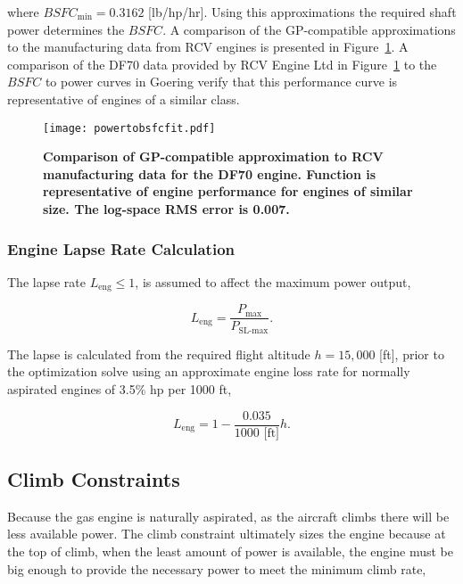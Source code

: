 \documentclass[]{aiaa-tc}%
\begin{document}
where $BSFC_{\text{min}} = 0.3162$ [lb/hp/hr].\cite{rcvengines}
Using this approximations the required shaft power determines the $BSFC$.
A comparison of the GP-compatible approximations to the manufacturing data from RCV engines is presented in Figure~\ref{f:powervsweightfit}. A comparison of the DF70 data provided by RCV Engine Ltd in Figure~\ref{f:powervsweightfit} to the $BSFC$ to power curves in Goering\cite{bsfcperf} verify that this performance curve is representative of engines of a similar class. 

\begin{figure}[H]
	\begin{center}
	\texttt{[image: powertobsfcfit.pdf]}
 \caption{\textbf{Comparison of GP-compatible approximation to RCV manufacturing data for the DF70 engine.  Function is representative of engine performance for engines of similar size.  The log-space RMS error is 0.007. }}
	\label{f:powervsweightfit}
	\end{center}
\end{figure}

\subsubsection{Engine Lapse Rate Calculation}

The lapse rate $L_{\text{eng}} \leq 1$, is assumed to affect the maximum power output,

\begin{equation}
    \label{e:lapse}
    L_{\text{eng}} = \frac{P_{\text{max}}}{P_{\text{SL-max}}}.
\end{equation}

The lapse is calculated from the required flight altitude $h=15,000$ [ft], prior to the optimization solve using an approximate engine loss rate for normally aspirated engines of 3.5\% hp per 1000 ft,\cite{enginelapse}

\begin{equation}
    \label{e:lapsefit}
    L_{\text{eng}} = 1 - \frac{0.035}{1000 \text{ [ft]}} h.
\end{equation}

\subsection{Climb Constraints}

Because the gas engine is naturally aspirated, as the aircraft climbs there will be less available power.  
The climb constraint ultimately sizes the engine because at the top of climb, when the least amount of power is available, the engine must be big enough to provide the necessary power to meet the minimum climb rate, 
\end{document}
